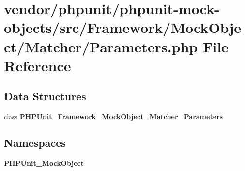 \section{vendor/phpunit/phpunit-\/mock-\/objects/src/\+Framework/\+Mock\+Object/\+Matcher/\+Parameters.php File Reference}
\label{_parameters_8php}
\subsection*{Data Structures}
\begin{DoxyCompactItemize}
\item 
class {\bf P\+H\+P\+Unit\+\_\+\+Framework\+\_\+\+Mock\+Object\+\_\+\+Matcher\+\_\+\+Parameters}
\end{DoxyCompactItemize}
\subsection*{Namespaces}
\begin{DoxyCompactItemize}
\item 
 {\bf P\+H\+P\+Unit\+\_\+\+Mock\+Object}
\end{DoxyCompactItemize}
